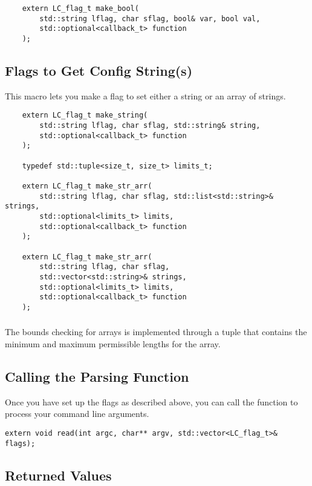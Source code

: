 \begin{verbatim}
	extern LC_flag_t make_bool(
		std::string lflag, char sflag, bool& var, bool val,
		std::optional<callback_t> function
	);
\end{verbatim}

\subsection{Flags to Get Config String(s)}
This macro lets you make a flag to set either a string or an array of strings.

\begin{verbatim}
	extern LC_flag_t make_string(
		std::string lflag, char sflag, std::string& string,
		std::optional<callback_t> function
	);

	typedef std::tuple<size_t, size_t> limits_t;

	extern LC_flag_t make_str_arr(
		std::string lflag, char sflag, std::list<std::string>& strings,
		std::optional<limits_t> limits,
		std::optional<callback_t> function
	);

	extern LC_flag_t make_str_arr(
		std::string lflag, char sflag,
		std::vector<std::string>& strings,
		std::optional<limits_t> limits,
		std::optional<callback_t> function
	);
\end{verbatim}

\subsubsection{}
\label{sec:limits_t}

The bounds checking for arrays is implemented through a tuple that contains the minimum and maximum permissible lengths for the array.

\subsection{Calling the Parsing Function}

Once you have set up the flags as described above, you can call the  function to process your command line arguments.

\begin{verbatim}
extern void read(int argc, char** argv, std::vector<LC_flag_t>& flags);
\end{verbatim}

\subsection{Returned Values}

